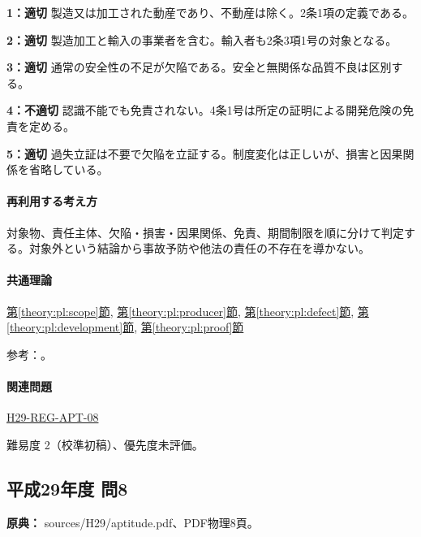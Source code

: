 \noindent\textbf{1：適切} 製造又は加工された動産であり、不動産は除く。2条1項の定義である。\par

\noindent\textbf{2：適切} 製造加工と輸入の事業者を含む。輸入者も2条3項1号の対象となる。\par

\noindent\textbf{3：適切} 通常の安全性の不足が欠陥である。安全と無関係な品質不良は区別する。\par

\noindent\textbf{4：不適切} 認識不能でも免責されない。4条1号は所定の証明による開発危険の免責を定める。\par

\noindent\textbf{5：適切} 過失立証は不要で欠陥を立証する。制度変化は正しいが、損害と因果関係を省略している。\par

\paragraph{再利用する考え方} 対象物、責任主体、欠陥・損害・因果関係、免責、期間制限を順に分けて判定する。対象外という結論から事故予防や他法の責任の不存在を導かない。

\paragraph{共通理論} \hyperref[theory:pl:scope]{第\ref*{theory:pl:scope}節}, \hyperref[theory:pl:producer]{第\ref*{theory:pl:producer}節}, \hyperref[theory:pl:defect]{第\ref*{theory:pl:defect}節}, \hyperref[theory:pl:development]{第\ref*{theory:pl:development}節}, \hyperref[theory:pl:proof]{第\ref*{theory:pl:proof}節}

\par 参考：\cite{pl_statute,pl_qa,pl_definitions2018}。

\paragraph{関連問題} \hyperref[q:h29-reg-apt-08]{H29-REG-APT-08}

\par 難易度 2（校準初稿）、優先度未評価。

\subsection{平成29年度 問8}
\label{q:h29-reg-apt-08}

\noindent\textbf{原典：} sources/H29/aptitude.pdf、PDF物理8頁。

